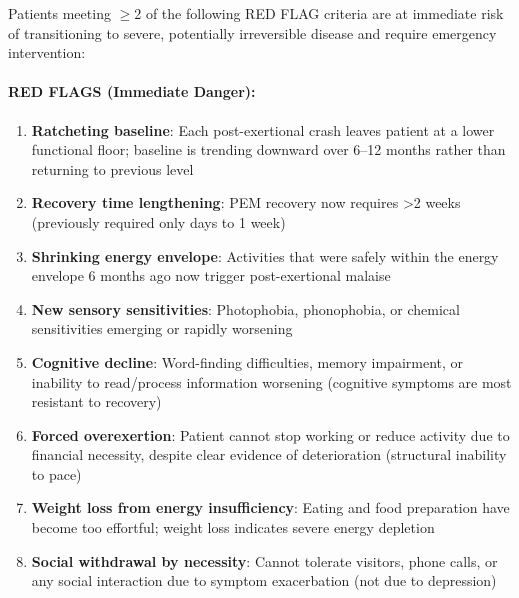 \begin{warning}
\label{warn:progression-risk}
Patients meeting $\geq$2 of the following RED FLAG criteria are at immediate risk of transitioning to severe, potentially irreversible disease and require emergency intervention:

\paragraph{RED FLAGS (Immediate Danger):}
\begin{enumerate}
    \item \textbf{Ratcheting baseline}: Each post-exertional crash leaves patient at a lower functional floor; baseline is trending downward over 6--12 months rather than returning to previous level

    \item \textbf{Recovery time lengthening}: PEM recovery now requires >2 weeks (previously required only days to 1 week)

    \item \textbf{Shrinking energy envelope}: Activities that were safely within the energy envelope 6 months ago now trigger post-exertional malaise

    \item \textbf{New sensory sensitivities}: Photophobia, phonophobia, or chemical sensitivities emerging or rapidly worsening

    \item \textbf{Cognitive decline}: Word-finding difficulties, memory impairment, or inability to read/process information worsening (cognitive symptoms are most resistant to recovery)~\cite{Chu2019}

    \item \textbf{Forced overexertion}: Patient cannot stop working or reduce activity due to financial necessity, despite clear evidence of deterioration (structural inability to pace)

    \item \textbf{Weight loss from energy insufficiency}: Eating and food preparation have become too effortful; weight loss indicates severe energy depletion

    \item \textbf{Social withdrawal by necessity}: Cannot tolerate visitors, phone calls, or any social interaction due to symptom exacerbation (not due to depression)
\end{enumerate}


\end{warning}
